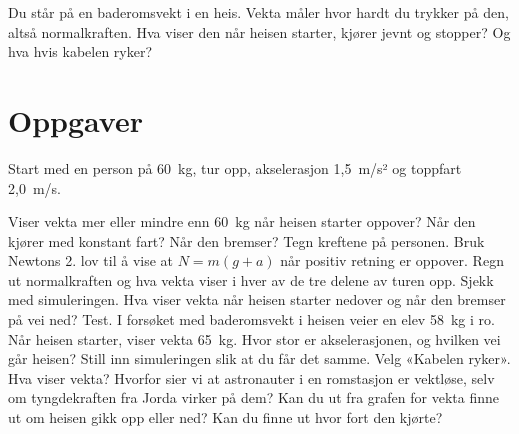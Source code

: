 \documentclass[11pt]{article}
\begin{document}

Du står på en baderomsvekt i en heis. Vekta måler hvor hardt du trykker på den, altså normalkraften. Hva viser den når heisen starter, kjører jevnt og stopper? Og hva hvis kabelen ryker?

\section*{Oppgaver}

Start med en person på 60~kg, tur opp, akselerasjon 1,5~m/s² og toppfart 2,0~m/s.

\begin{oppgaveliste}
\oppgave {}Viser vekta mer eller mindre enn 60~kg når heisen starter oppover? Når den kjører med konstant fart? Når den bremser?
\svar
\oppgave {}Tegn kreftene på personen. Bruk Newtons 2. lov til å vise at $N = m(g + a)$ når positiv retning er oppover.
\svar
\oppgave {}Regn ut normalkraften og hva vekta viser i hver av de tre delene av turen opp. Sjekk med simuleringen.
\svar
\oppgave {}Hva viser vekta når heisen starter nedover og når den bremser på vei ned? Test.
\svar
\oppgave {}I forsøket med baderomsvekt i heisen veier en elev 58~kg i ro. Når heisen starter, viser vekta 65~kg. Hvor stor er akselerasjonen, og hvilken vei går heisen? Still inn simuleringen slik at du får det samme.
\svar
\oppgave {}Velg «Kabelen ryker». Hva viser vekta? Hvorfor sier vi at astronauter i en romstasjon er vektløse, selv om tyngdekraften fra Jorda virker på dem?
\svar
\oppgave {}Kan du ut fra grafen for vekta finne ut om heisen gikk opp eller ned? Kan du finne ut hvor fort den kjørte?
\svar
\end{oppgaveliste}
\end{document}
